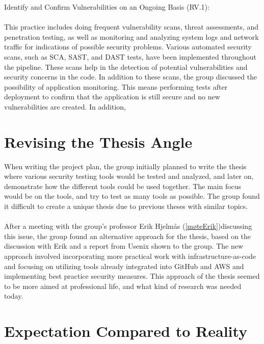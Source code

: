 Identify and Confirm Vulnerabilities on an Ongoing Basis (RV.1): \cite{ssdf}
\\~\\This practice includes doing frequent vulnerability scans, threat assessments, and penetration testing, as well as monitoring and analyzing system logs and network traffic for indications of possible security problems. Various automated security scans, such as SCA, SAST, and DAST tests, have been implemented throughout the pipeline. These scans help in the detection of potential vulnerabilities and security concerns in the code. In addition to these scans, the group discussed the possibility of application monitoring. This means performing tests after deployment to confirm that the application is still secure and no new vulnerabilities are created. In addition, 

\section{Revising the Thesis Angle}
When writing the project plan, the group initially planned to write the thesis where various security testing tools would be tested and analyzed, and later on, demonstrate how the different tools could be used together. The main focus would be on the tools, and try to test as many tools as possible. The group found it difficult to create a unique thesis due to previous theses with similar topics. 
\\~\\
After a meeting with the group's professor Erik Hjelmås  (\ref{møteErik})discussing this issue, the group found an alternative approach for the thesis, based on the discussion with Erik and a report from Usenix \cite{usenixreport} shown to the group. The new approach involved incorporating more practical work with infrastructure-as-code and focusing on utilizing tools already integrated into GitHub and AWS and implementing best practice security measures. This approach of the thesis seemed to be more aimed at professional life, and what kind of research was needed today.  


\section{Expectation Compared to Reality}
